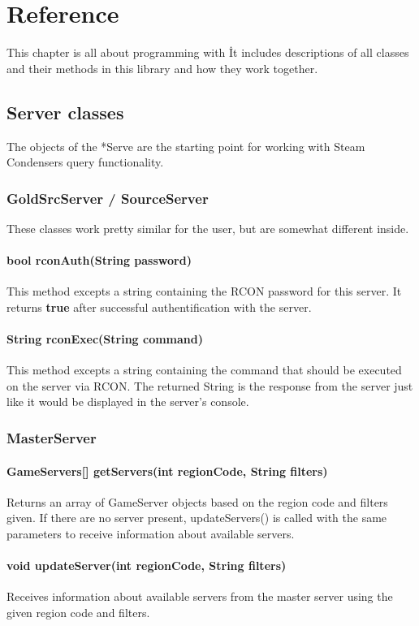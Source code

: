 \chapter{Reference}
This chapter is all about programming with \steamcondenser\. It includes
descriptions of all classes and their methods in this library and how they work
together.

\section{Server classes}
The objects of the *Serve are the starting point for working with Steam Condensers query functionality.

\subsection{GoldSrcServer / SourceServer}
These classes work pretty similar for the user, but are somewhat different inside.

\subsubsection{bool rconAuth(String password)}
This method excepts a string containing the RCON password for this server. It returns \textbf{true} after successful authentification with the server.


\subsubsection{String rconExec(String command)}
\label{rconExec}
This method excepts a string containing the command that should be executed on the server via RCON. The returned String is the response from the server just like it would be displayed in the server's console.

\subsection{MasterServer}

\subsubsection{GameServers[] getServers(int regionCode, String filters)}
Returns an array of GameServer objects based on the region code and filters given. If there are no server present, updateServers() is called with the same parameters to receive information about available servers.

\subsubsection{void updateServer(int regionCode, String filters)}
Receives information about available servers from the master server using the given region code and filters.